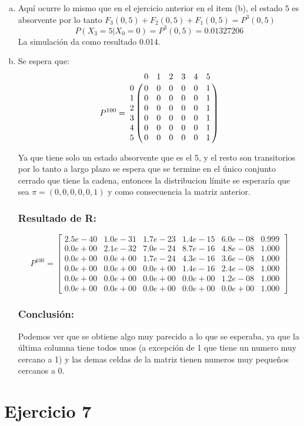 \documentclass{article}
\begin{document}
\begin{enumerate}[(a)]
\item Aquí ocurre lo mismo que en el ejercicio anterior en el item (b), el estado $5$ es absorvente por lo tanto $F_{3}(0,5) + F_{2}(0,5) + F_{1}(0,5) = P^{3}(0,5)$
$$P(X_3 = 5 | X_0 = 0) = P^{3}(0,5) = 0.01327206 $$ 
La simulación da como resultado 0.014.

\item Se espera que: $$ P^{100} =
\bordermatrix{ 
\text{} & 0 & 1 & 2 & 3 & 4 & 5\cr
0 & 0 & 0 & 0 & 0 & 0 & 1 \cr
1 & 0 & 0 & 0 & 0 & 0 & 1 \cr
2 & 0 & 0 & 0 & 0 & 0 & 1 \cr
3 & 0 & 0 & 0 & 0 & 0 & 1 \cr
4 & 0 & 0 & 0 & 0 & 0 & 1 \cr
5 & 0 & 0 & 0 & 0 & 0 & 1
}
$$

Ya que tiene solo un estado absorvente que es el 5, y el resto son transitorios por lo tanto a largo plazo se espera que se termine en el único conjunto cerrado que tiene la cadena, entonces la distribucion límite se esperaría que sea $\pi = (0,0,0,0,0,1)$ y como consecuencia la matriz anterior.

\subsubsection*{Resultado de R:}
$$
P^{100} = 
\begin{bmatrix}
2.5e-40 & 1.0e-31 & 1.7e-23 & 1.4e-15 & 6.0e-08 & 0.999 \\
0.0e+00 & 2.1e-32 & 7.0e-24 & 8.7e-16 & 4.8e-08 & 1.000 \\
0.0e+00 & 0.0e+00 & 1.7e-24 & 4.3e-16 & 3.6e-08 & 1.000 \\
0.0e+00 & 0.0e+00 & 0.0e+00 & 1.4e-16 & 2.4e-08 & 1.000 \\
0.0e+00 & 0.0e+00 & 0.0e+00 & 0.0e+00 & 1.2e-08 & 1.000 \\
0.0e+00 & 0.0e+00 & 0.0e+00 & 0.0e+00 & 0.0e+00 & 1.000
\end{bmatrix}
$$

\subsubsection*{Conclusión:}

Podemos ver que se obtiene algo muy parecido a lo que se esperaba, ya que la última columna tiene todos unos (a excepción de 1 que tiene un numero muy cercano a 1) y las demas celdas de la matriz tienen numeros muy pequeños cercanos a 0.

\end{enumerate}

\section*{Ejercicio 7}
\end{document}
